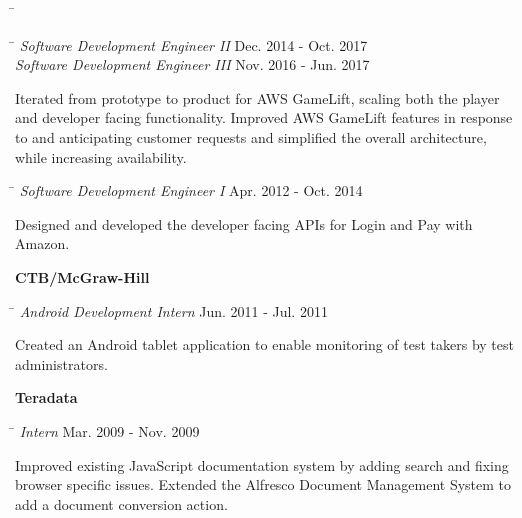 \documentclass{res}
\begin{document}
\begin{resume}
    \begin{tabbing}\hspace{4.6in}\= \kill
    \end{tabbing}\vspace{-30pt}
    \vspace{-10pt}

    \begin{tabbing}\hspace{4.6in}\= \kill
    {\emph{Software Development Engineer II}}      \>Dec. 2014 - Oct. 2017\\
    {\emph{Software Development Engineer III}}     \>Nov. 2016 - Jun. 2017\\
    \end{tabbing}\vspace{-30pt}
    Iterated from prototype to product for AWS GameLift, scaling both the player
    and developer facing functionality.  Improved AWS GameLift features in response 
    to and anticipating customer requests and simplified the overall architecture, 
    while increasing availability.
    \vspace{-10pt}
    
    \begin{tabbing}\hspace{4.6in}\= \kill
    {\emph{Software Development Engineer I}}      \>Apr. 2012 - Oct. 2014\\
    \end{tabbing}\vspace{-30pt}
    Designed and developed the developer facing APIs for Login and Pay with Amazon.

    {\bf CTB/McGraw-Hill}\vspace{-20pt}
    \begin{tabbing}\hspace{4.6in}\= \kill
    {\emph{Android Development Intern}}      \>Jun. 2011 - Jul. 2011\\
    \end{tabbing}\vspace{-30pt}      %
    Created an Android tablet application to enable monitoring of test takers by
    test administrators.

    {\bf Teradata}\vspace{-20pt}
    \begin{tabbing}\hspace{4.6in}\= \kill
    {\emph{Intern}}      \>Mar. 2009 - Nov. 2009\\
    \end{tabbing}\vspace{-30pt}      %
    Improved existing JavaScript documentation system by adding search and fixing browser specific
    issues.  Extended the Alfresco Document Management System to add a document conversion 
    action.


\end{resume}
\end{document}
